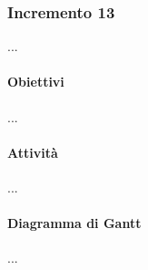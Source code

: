 \subsubsection{Incremento 13}
...
\paragraph{Obiettivi}
...
\paragraph{Attività}
...
\paragraph{Diagramma di Gantt}
...

